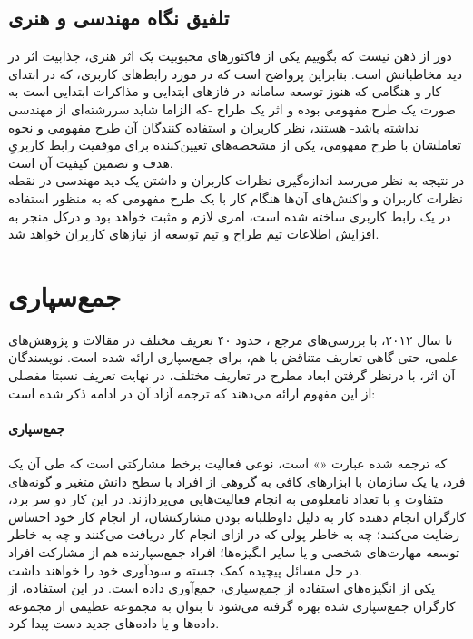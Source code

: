 \subsection{تلفیق نگاه مهندسی و هنری}
دور از ذهن نیست که بگوییم یکی از فاکتورهای محبوبیت یک اثر هنری، جذابیت اثر در دید مخاطبانش است. بنابراین پرواضح است که در مورد رابط‌های کاربری، که در ابتدای کار و هنگامی که هنوز توسعه سامانه در فازهای ابتدایی و مذاکرات ابتدایی است به صورت یک طرح مفهومی بوده و اثر یک طراح -که الزاما شاید سررشته‌ای از مهندسی نداشته باشد- هستند، نظر کاربران و استفاده کنندگان آن طرح مفهومی و نحوه تعاملشان با طرح مفهومی، یکی از مشخصه‌های تعیین‌کننده برای موفقیت رابط کاربریِ هدف و تضمین کیفیت آن است.\\
در نتیجه به نظر می‌رسد اندازه‌گیری نظرات کاربران و داشتن یک دید مهندسی در نقطه نظرات کاربران و واکنش‌های آن‌ها هنگام کار با یک طرح مفهومی که به منظور استفاده در یک رابط کاربری ساخته شده است، امری لازم و مثبت خواهد بود و درکل منجر به افزایش اطلاعات تیم طراح و تیم توسعه از نیازهای کاربران خواهد شد.
\section{جمع‌سپاری}
تا سال ۲۰۱۲، با بررسی‌های مرجع 
\cite{estelles-arolas_towards_2012}،
حدود ۴۰ تعریف مختلف در مقالات و پژوهش‌های علمی، حتی گاهی تعاریف متناقض با هم، برای جمع‌سپاری ارائه شده است. نویسندگان آن اثر، با درنظر گرفتن ابعاد مطرح در تعاریف مختلف، در نهایت تعریف نسبتا مفصلی از این مفهوم ارائه می‌دهند که ترجمه آزاد آن در ادامه ذکر شده است: 
\paragraph{جمع‌سپاری}
که ترجمه شده عبارت
«»
است، نوعی فعالیت برخط
مشارکتی است که طی آن یک فرد، یا یک سازمان با ابزارهای کافی به گروهی از افراد با سطح دانش متغیر و گونه‌های متفاوت و با تعداد نامعلومی به انجام فعالیت‌هایی می‌پردازند. در این کار دو سر برد، کارگران انجام دهنده کار
به دلیل داوطلبانه بودن مشارکتشان، از انجام کار خود احساس رضایت می‌کنند؛ چه به خاطر پولی که در ازای انجام کار دریافت می‌کنند و چه به خاطر توسعه مهارت‌های شخصی و یا سایر انگیزه‌ها؛ افراد جمع‌سپارنده هم از مشارکت افراد در حل مسائل پیچیده کمک جسته و سودآوری خود را خواهند داشت. \\
یکی از انگیزه‌های استفاده از جمع‌سپاری، جمع‌آوری داده
است. در این استفاده، از کارگران جمع‌سپاری شده بهره گرفته می‌شود تا بتوان به مجموعه عظیمی از مجموعه داده‌ها و یا داده‌های جدید دست پیدا کرد.

